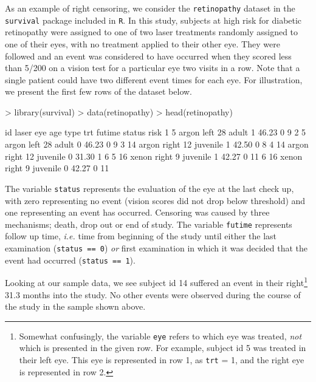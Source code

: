 \documentclass[a4paper]{article}
\begin{document}
    As an example of right censoring, we consider the \texttt{retinopathy} dataset in the \texttt{survival} package included in \texttt{R}. In this study, subjects at high risk for diabetic retinopathy were assigned to one of two laser treatments randomly assigned to one of their eyes, with no treatment applied to their other eye. They were followed and an event was considered to have occurred when they scored less than 5/200 on a vision test for a particular eye two visits in a row. Note that a single patient could have two different event times for each eye. For illustration, we present the first few rows of the dataset below. 
    
\begin{Schunk}
\begin{Sinput}
> library(survival)
> data(retinopathy)
> head(retinopathy)
\end{Sinput}
\begin{Soutput}
  id laser   eye age     type trt futime status risk
1  5 argon  left  28    adult   1  46.23      0    9
2  5 argon  left  28    adult   0  46.23      0    9
3 14 argon right  12 juvenile   1  42.50      0    8
4 14 argon right  12 juvenile   0  31.30      1    6
5 16 xenon right   9 juvenile   1  42.27      0   11
6 16 xenon right   9 juvenile   0  42.27      0   11
\end{Soutput}
\end{Schunk}

  The variable \texttt{status} represents the evaluation of the eye at the last check up, with zero representing no event (vision scores did not drop below threshold) and one representing an event has occurred. Censoring was caused by three mechanisms; death, drop out or end of study. The variable \texttt{futime} represents follow up time, \emph{i.e.} time from beginning of the study until either the last examination (\texttt{status == 0}) \emph{or} first examination in which it was decided that the event had occurred (\texttt{status == 1}). 
  
  Looking at our sample data, we see subject id 14 suffered an event in their right\footnote{Somewhat confusingly, the variable \texttt{eye} refers to which eye was treated, \emph{not} which is presented in the given row. For example, subject id 5 was treated in their left eye. This eye is represented in row 1, as \texttt{trt} = 1, and the right eye is represented in row 2.} 31.3 months into the study. No other events were observed during the course of the study in the sample shown above. 
  
\end{document}
